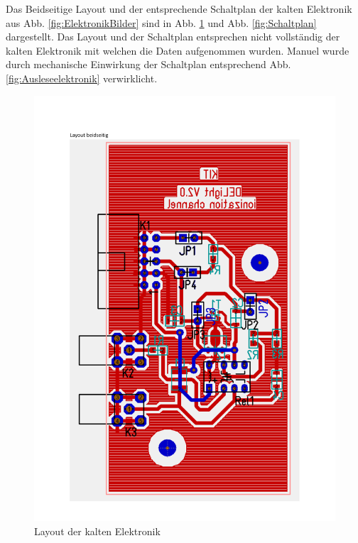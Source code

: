 Das Beidseitige Layout und der entsprechende Schaltplan der kalten Elektronik aus Abb. \ref{fig:ElektronikBilder} sind in Abb. \ref{fig:Layout} und Abb. \ref{fig:Schaltplan} dargestellt.
Das Layout und der Schaltplan entsprechen nicht vollständig der kalten Elektronik mit welchen die Daten aufgenommen wurden.
Manuel wurde durch mechanische Einwirkung der Schaltplan entsprechend Abb. \ref{fig:Ausleseelektronik} verwirklicht.

\begin{figure}[!b]
\begin{center}
\includegraphics[page=1,width=\textwidth]{./fig/SchaltplanLayoutV2.pdf}
\vspace{-0.5cm}
\caption{Layout der kalten Elektronik}
\label{fig:Layout}
\end{center}
\end{figure}
